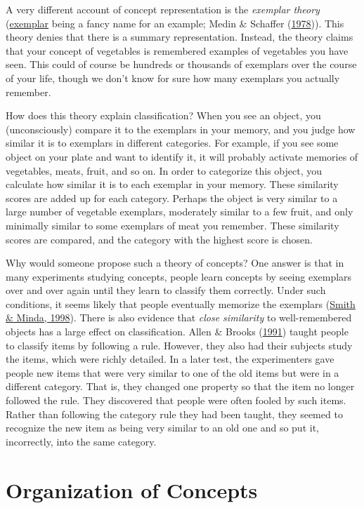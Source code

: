 \documentclass[
]{krantz}
\begin{document}
A very different account of concept representation is the \emph{exemplar theory} (\protect\hyperlink{exemplar}{exemplar} being a fancy name for an example; Medin \& Schaffer (\protect\hyperlink{ref-Medin1978}{1978})). This theory denies that there is a summary representation. Instead, the theory claims that your concept of vegetables is remembered examples of vegetables you have seen. This could of course be hundreds or thousands of exemplars over the course of your life, though we don't know for sure how many exemplars you actually remember.

How does this theory explain classification? When you see an object, you (unconsciously) compare it to the exemplars in your memory, and you judge how similar it is to exemplars in different categories. For example, if you see some object on your plate and want to identify it, it will probably activate memories of vegetables, meats, fruit, and so on. In order to categorize this object, you calculate how similar it is to each exemplar in your memory. These similarity scores are added up for each category. Perhaps the object is very similar to a large number of vegetable exemplars, moderately similar to a few fruit, and only minimally similar to some exemplars of meat you remember. These similarity scores are compared, and the category with the highest score is chosen.

Why would someone propose such a theory of concepts? One answer is that in many experiments studying concepts, people learn concepts by seeing exemplars over and over again until they learn to classify them correctly. Under such conditions, it seems likely that people eventually memorize the exemplars (\protect\hyperlink{ref-Smith1998}{Smith \& Minda, 1998}). There is also evidence that \emph{close similarity} to well-remembered objects has a large effect on classification. Allen \& Brooks (\protect\hyperlink{ref-Allen1991}{1991}) taught people to classify items by following a rule. However, they also had their subjects study the items, which were richly detailed. In a later test, the experimenters gave people new items that were very similar to one of the old items but were in a different category. That is, they changed one property so that the item no longer followed the rule. They discovered that people were often fooled by such items. Rather than following the category rule they had been taught, they seemed to recognize the new item as being very similar to an old one and so put it, incorrectly, into the same category.

\hypertarget{organization-of-concepts}{%
\section{Organization of Concepts}\label{organization-of-concepts}}
\end{document}
